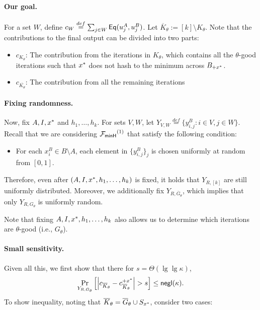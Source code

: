 \paragraph{Our goal.}
For a set $W$, define $c_W \stackrel{def}{=} \sum_{j \in W} \mathsf{Eq}(u^A_j, u^B_j)$. Let $\overline K_\theta := [k] \setminus K_\theta$.
Note that the contributions to the final output can be divided into two parts:
\begin{itemize}
    \item  $c_{K_\theta}$:  The contribution from the iterations in $K_\theta$, which contains all the $\theta$-good iterations such that ${x^*}$ does not hash to the minimum across $B_{+x^*}$.
    
    \item $c_{\overline{K_\theta}}$:  The contribution from all the remaining iterations  
\end{itemize}
%

\iffalse
\paragraph{Fixing randomness.}
Now, fix $A, I, {x^*}$ and $h_1, \ldots, h_k$.
For sets $V, W$, let $Y_{V,W} \stackrel{def}{=}  \{ y^B_{i,j}: i \in V, j \in W\}$.
Recall that we are considering ${\mathcal{F}_\mathsf{minH}}^{(1)}$ that satisfy the following condition: 
\begin{itemize}
\item For each $x^B_i \in B\setminus A$, each element in $\{y^B_{i,j}\}_j$ is chosen uniformly
at random from $[0,1]$.
\end{itemize}
Therefore, even after $(A, I, {x^*}, h_1, \ldots, h_k)$ is fixed, it holds that $Y_{R, [k]}$ are still uniformly distributed. 
Moreover, we additionally fix $Y_{R, \overline G_\theta}$, which implies that only $Y_{R, G_\theta}$ is uniformly random. 

Note that fixing 
$A, I, {x^*}, h_1, \ldots, h_k$ also allows us to determine which iterations are
$\theta$-good (i.e., $G_\theta$). 

\paragraph{Small sensitivity.}
Given all this, we first show that there for $s = \Theta(\lg\lg\kappa)$, 
\[\Pr_{Y_{R, G_\theta}}\left[\left|c_{\overline K_\theta} -
c^{\xp}_{\overline
K_\theta}\right|> s \right] \le \negl(\kappa).\]
%
To show inequality, noting
that $\overline K_\theta = \overline G_\theta \cup S_{{x^*}}$, consider two cases: 

